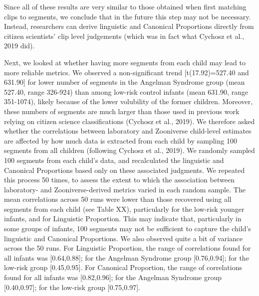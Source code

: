 \documentclass[english,,man,floatsintext]{apa6}
\begin{document}
Since all of these results are very similar to those obtained when first matching clips to segments, we conclude that in the future this step may not be necessary. Instead, researchers can derive linguistic and Canonical Proportions directly from citizen scientists' clip level judgements (which was in fact what Cychosz et al., 2019 did).

Next, we looked at whether having more segments from each child may lead to more reliable metrics. We observed a non-significant trend {[}t(17.92)=527.40 and 631.90{]} for lower number of segments in the Angelman Syndrome group (mean 527.40, range 326-924) than among low-risk control infants (mean 631.90, range 351-1074), likely because of the lower volubility of the former children. Moreover, these numbers of segments are much larger than those used in previous work relying on citizen science classifications (Cychosz et al., 2019). We therefore asked whether the correlations between laboratory and Zooniverse child-level estimates are affected by how much data is extracted from each child by sampling 100 segments from all children (following Cychosz et al., 2019). We randomly sampled 100 segments from each child's data, and recalculated the linguistic and Canonical Proportions based only on these associated judgments. We repeated this process 50 times, to assess the extent to which the association between laboratory- and Zooniverse-derived metrics varied in each random sample. The mean correlations across 50 runs were lower than those recovered using all segments from each child (see Table XX), particularly for the low-risk younger infants, and for Linguistic Proportion. This may indicate that, particularly in some groups of infants, 100 segments may not be sufficient to capture the child's linguistic and Canonical Proportions. We also observed quite a bit of variance across the 50 runs. For Linguistic Proportion, the range of correlations found for all infants was {[}0.64,0.88{]}; for the Angelman Syndrome group {[}0.76,0.94{]}; for the low-risk group {[}0.45,0.95{]}. For Canonical Proportion, the range of correlations found for all infants was {[}0.82,0.96{]}; for the Angelman Syndrome group {[}0.40,0.97{]}; for the low-risk group {[}0.75,0.97{]}.
\end{document}

